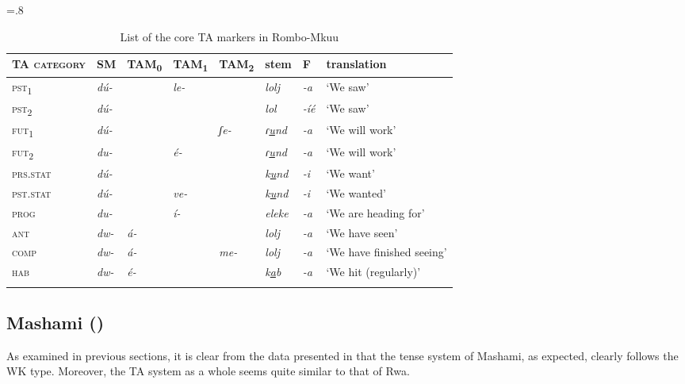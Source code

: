 \documentclass[output=paper]{langscibook}
\begin{document}
\begin{table}
\small\tabcolsep=.8\tabcolsep
\begin{tabular}{>{\scshape}llllllll}
\lsptoprule
{\normalfont TA category} & SM & {TAM\textsubscript{0}} & {TAM\textsubscript{1}} & {TAM\textsubscript{2}} & stem & F & translation\\\midrule
pst\textsubscript{1}   & {\itshape dú-} &  & {\itshape le-} &  & {\itshape lolj} & {\itshape {}-a} & `We saw'\\
pst\textsubscript{2}   & {\itshape dú-} &  &  &  & {\itshape lol} & {\itshape {}-íé} & `We saw'\\
fut\textsubscript{1}   & {\itshape dú-} &  &  & {\itshape ʃe-} & {\textit{ɾ\ul{u}nd}} & {\itshape {}-a} & `We will work'\\
fut\textsubscript{2}   & {\itshape du-} &  & {\itshape é-} &  & {\textit{ɾ\ul{u}nd}} & {\itshape {}-a} & `We will work'\\
prs.stat               & {\itshape dú-} &  &  &  & {\textit{k\ul{u}nd}} & {\itshape {}-i} & `We want'\\
pst.stat               & {\itshape dú-} &  & {\itshape ve-} &  & {\textit{k\ul{u}nd}} & {\itshape {}-i} & `We wanted'\\
prog                   & {\itshape du-} &  & {\itshape í-} &  & {\itshape eleke} & {\itshape {}-a} & {`We are heading for'}\\
ant                    & {\itshape dw-} & {\itshape á-} &  &  & {\itshape lolj} & {\itshape {}-a} & `We have seen' \\
comp                   & {\itshape dw-} & {\itshape á-} &  & {\itshape me-} & {\itshape lolj} & {\itshape {}-a} & `We have finished seeing' \\
hab                    & {\itshape dw-} & {\itshape é-} &  &  & {\textit{k\ul{a}b}} & {\itshape {}-a} & `We hit (regularly)' \\
\lspbottomrule
\end{tabular}
\caption{List of the core TA markers in Rombo-Mkuu}
\label{tab:shinagawa:4}
\end{table}

\subsection{Mashami (\citealt{RugemaliraPhanuel2012})}\label{sec:shinagawa:2.5}

As examined in previous sections, it is clear from the data presented in  that the tense system of Mashami, as expected, clearly follows the WK type. Moreover, the TA system as a whole seems quite similar to that of Rwa.
\end{document}
